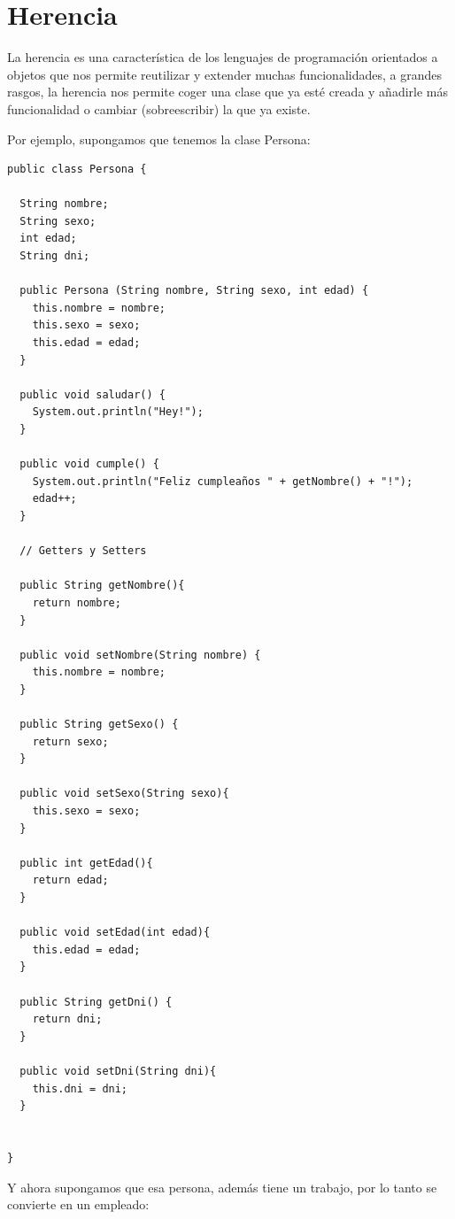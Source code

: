 \documentclass[11pt]{article}
\begin{document}
\section{Herencia}
\label{sec:org917edc9}
La herencia es una característica de los lenguajes de programación orientados a objetos que nos permite reutilizar y extender muchas funcionalidades, a grandes rasgos, la herencia nos permite coger una clase que ya esté creada y añadirle más funcionalidad o cambiar (sobreescribir) la que ya existe. 

Por ejemplo, supongamos que tenemos la clase Persona:

\begin{verbatim}
public class Persona {

  String nombre;
  String sexo;
  int edad;
  String dni;

  public Persona (String nombre, String sexo, int edad) {
    this.nombre = nombre;
    this.sexo = sexo;
    this.edad = edad;
  }

  public void saludar() {
    System.out.println("Hey!");
  }

  public void cumple() {
    System.out.println("Feliz cumpleaños " + getNombre() + "!");
    edad++;
  }

  // Getters y Setters

  public String getNombre(){
    return nombre;
  }

  public void setNombre(String nombre) {
    this.nombre = nombre;
  }

  public String getSexo() {
    return sexo;
  }

  public void setSexo(String sexo){
    this.sexo = sexo;
  }

  public int getEdad(){
    return edad;
  }

  public void setEdad(int edad){
    this.edad = edad;
  }

  public String getDni() {
    return dni;
  }

  public void setDni(String dni){
    this.dni = dni;
  }


}
\end{verbatim}

Y ahora supongamos que esa persona, además tiene un trabajo, por lo tanto se convierte en un empleado:
\end{document}
